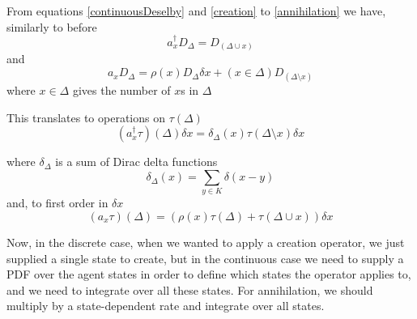 \documentclass[letterpaper,twocolumn,10pt]{article}
\begin{document}
From equations \ref{continuousDeselby} and \ref{creation} to \ref{annihilation} we have, similarly to before
\[
a_x^\dag D_\Delta = D_{(\Delta \cup x)}
\]
and
\[
a_x D_\Delta = \rho(x) D_\Delta \delta x + (x \in \Delta) D_{(\Delta \setminus x)}
\]
where $x \in \Delta$ gives the number of $x$s in $\Delta$

This translates to operations on $\tau(\Delta)$
\[
(a_x^\dag \tau)(\Delta)\delta x = \delta_\Delta(x)\tau(\Delta \setminus x)\delta x
\]

where $\delta_\Delta$ is a sum of Dirac delta functions
\[
\delta_\Delta(x) = \sum_{y\in K}\delta(x-y)
\]
and, to first order in $\delta x$
\[
(a_x \tau)(\Delta) = \left(\rho(x)\tau(\Delta) + \tau(\Delta \cup x)\right) \delta x
\]

Now, in the discrete case, when we wanted to apply a creation operator, we just supplied a single state to create, but in the continuous case we need to supply a PDF over the agent states in order to define which states the operator applies to, and we need to integrate over all these states. For annihilation, we should multiply by a state-dependent rate and integrate over all states.






\end{document}
